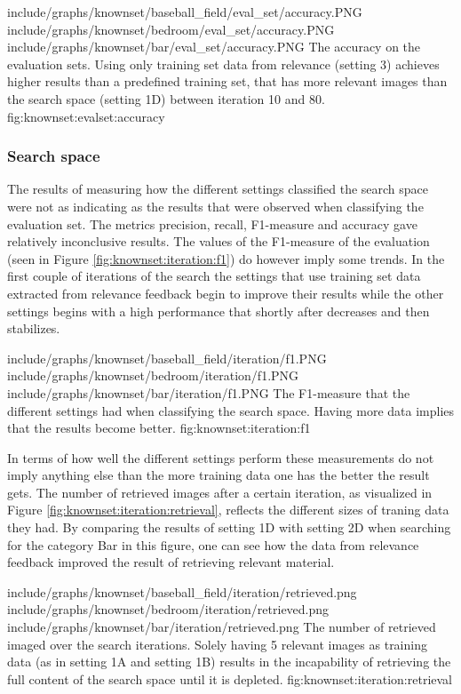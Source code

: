 \tripfigure
{include/graphs/knownset/baseball_field/eval_set/accuracy.PNG}
{include/graphs/knownset/bedroom/eval_set/accuracy.PNG}
{include/graphs/knownset/bar/eval_set/accuracy.PNG}
{The accuracy on the evaluation sets. Using only training set data from relevance (setting 3) achieves higher results than a predefined training set, that has more relevant images than the search space (setting 1D) between iteration 10 and 80.}
{fig:knownset:evalset:accuracy}

\subsubsection{Search space}
\label{sec:res:knownset:iter}

The results of measuring how the different settings classified the search space were not as indicating as the results that were observed when classifying the evaluation set. 
The metrics precision, recall, F1-measure and accuracy gave relatively inconclusive results. The values of the F1-measure of the evaluation (seen in Figure \ref{fig:knownset:iteration:f1}) do however imply some trends. In the first couple of iterations of the search the settings that use training set data extracted from relevance feedback begin to improve their results while the other settings begins with a high performance that shortly after decreases and then stabilizes.  

\tripfigurenear
{include/graphs/knownset/baseball_field/iteration/f1.PNG}
{include/graphs/knownset/bedroom/iteration/f1.PNG}
{include/graphs/knownset/bar/iteration/f1.PNG}
{The F1-measure that the different settings had when classifying the search space. Having more data implies that the results become better.}
{fig:knownset:iteration:f1}

In terms of how well the different settings perform these measurements do not imply anything else than the more training data one has the better the result gets. The number of retrieved images after a certain iteration, as visualized in Figure \ref{fig:knownset:iteration:retrieval}, reflects the different sizes of traning data they had. By comparing the results of setting 1D with setting 2D when searching for the category Bar in this figure, one can see how the data from relevance feedback improved the result of retrieving relevant material.

\tripfigurenear
{include/graphs/knownset/baseball_field/iteration/retrieved.png}
{include/graphs/knownset/bedroom/iteration/retrieved.png}
{include/graphs/knownset/bar/iteration/retrieved.png}
{The number of retrieved imaged over the search iterations. Solely having 5 relevant images as training data (as in setting 1A and setting 1B) results in the incapability of retrieving the full content of the search space until it is depleted.}
{fig:knownset:iteration:retrieval}

